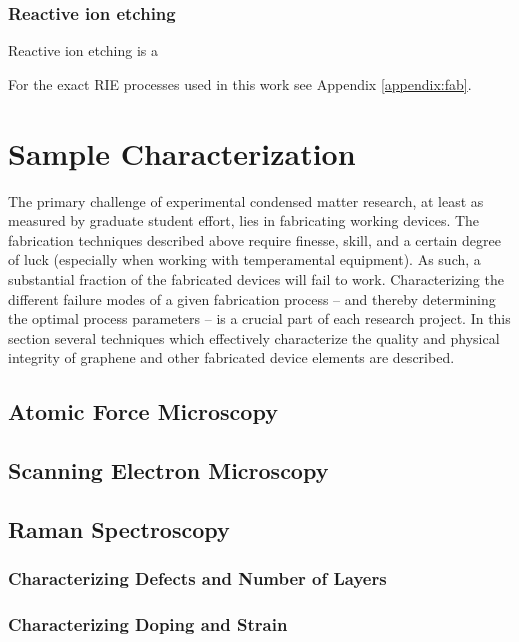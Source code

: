 \documentclass[edeposit,fullpage,draftthesis]{uiucthesis2009}
\begin{document}
            \subsubsection{Reactive ion etching}
            
            Reactive ion etching is a 
            
            For the exact RIE processes used in this work see Appendix \ref{appendix:fab}.
    
    \section{Sample Characterization}
    
    The primary challenge of experimental condensed matter research, at least as measured by graduate student effort, lies in fabricating working devices. The fabrication techniques described above require finesse, skill, and a certain degree of luck (especially when working with temperamental equipment). As such, a substantial fraction of the fabricated devices will fail to work. Characterizing the different failure modes of a given fabrication process -- and thereby determining the optimal process parameters -- is a crucial part of each research project. In this section several techniques which effectively characterize the quality and physical integrity of graphene and other fabricated device elements are described.
    
        \subsection{Atomic Force Microscopy}
        \subsection{Scanning Electron Microscopy}
        \subsection{Raman Spectroscopy}
            \subsubsection{Characterizing Defects and Number of Layers}
            \subsubsection{Characterizing Doping and Strain}
    
\end{document}
